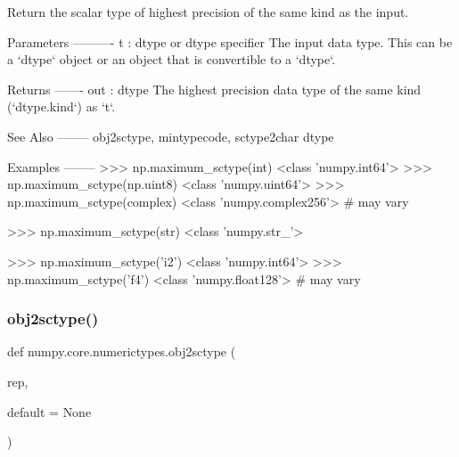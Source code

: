 \begin{DoxyVerb}Return the scalar type of highest precision of the same kind as the input.

Parameters
----------
t : dtype or dtype specifier
    The input data type. This can be a `dtype` object or an object that
    is convertible to a `dtype`.

Returns
-------
out : dtype
    The highest precision data type of the same kind (`dtype.kind`) as `t`.

See Also
--------
obj2sctype, mintypecode, sctype2char
dtype

Examples
--------
>>> np.maximum_sctype(int)
<class 'numpy.int64'>
>>> np.maximum_sctype(np.uint8)
<class 'numpy.uint64'>
>>> np.maximum_sctype(complex)
<class 'numpy.complex256'> # may vary

>>> np.maximum_sctype(str)
<class 'numpy.str_'>

>>> np.maximum_sctype('i2')
<class 'numpy.int64'>
>>> np.maximum_sctype('f4')
<class 'numpy.float128'> # may vary\end{DoxyVerb}
 \mbox{\label{namespacenumpy_1_1core_1_1numerictypes_a4112132097e16025a598ee650fdca003}} 
\subsubsection{\texorpdfstring{obj2sctype()}{obj2sctype()}}
{\footnotesize\ttfamily def numpy.\+core.\+numerictypes.\+obj2sctype (\begin{DoxyParamCaption}\item[{}]{rep,  }\item[{}]{default = {\ttfamily None} }\end{DoxyParamCaption})}


